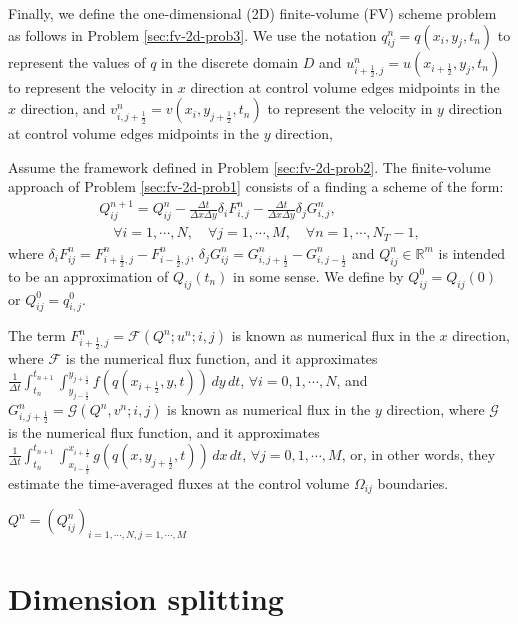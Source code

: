 Finally, we define the one-dimensional (2D) finite-volume (FV)
scheme problem as follows in Problem \ref{sec:fv-2d-prob3}.
We use the notation ${q}^n_{ij} = {q}(x_i, y_j, t_n)$
to represent the values of ${q}$ in the discrete domain $D$
and $u_{i+\frac{1}{2},j}^n = u(x_{i+\frac{1}{2}}, y_j, t_n)$
to represent the velocity in $x$ direction at control volume
edges midpoints in the $x$ direction, 
and $v_{i,j+\frac{1}{2}}^n = v(x_i,y_{j+\frac{1}{2}},t_n)$
to represent the velocity in $y$ direction at control volume
edges midpoints in the $y$ direction, 
\begin{prob}[2D-FV scheme]
	\label{sec:fv-2d-prob3}
	Assume the framework defined in Problem \ref{sec:fv-2d-prob2}.
	The finite-volume approach of Problem \ref{sec:fv-2d-prob1}
	consists of a finding a scheme of the form:
	\begin{align*}
		{Q}_{ij}^{n+1} =  {Q}_{ij}^{n} -
		\frac{\Delta t}{\Delta x \Delta y} 
        \delta_i {F}_{i,j}^{n} - 
		\frac{\Delta t}{\Delta x \Delta y}
        \delta_j {G}_{i,j}^{n},
		\\ \nonumber \quad \forall i = 1, \cdots, N, \quad \forall j = 1, \cdots, M,
		\quad \forall n = 1, \cdots, N_T-1,
	\end{align*}
	where $ \delta_i F_{ij}^n =
    {F}_{i+\frac{1}{2},j}^{n} 
    - {F}_{i-\frac{1}{2},j}^{n}$,
    $ \delta_j G_{ij}^n =
    {G}_{i,j+\frac{1}{2}}^{n} 
    - {G}_{i,j-\frac{1}{2}}^{n}$ 
    and ${Q}_{ij}^{n} \in \mathbb{R}^m$ is intended to be an approximation
	of ${Q}_{ij}(t_{n})$ in some sense. We define by ${Q}_{ij}^{0} = {Q}_{ij}(0)$ or
	${Q}_{ij}^{0} = {q}^0_{i,j}$.
    
    The term ${F}_{i+\frac{1}{2}, j}^{n} = {\mathcal{F}}
    (Q^n; u^n; i,j)
    $ is known as numerical flux in the 
    $x$ direction, where $\mathcal{F}$ is the numerical flux function, 
    and it approximates
	$\frac{1}{\Delta t}\int_{t_n}^{t_{n+1}} 
    \int_{y_{j-\frac{1}{2}}}^{y_{j+\frac{1}{2}}} 
    {f}({q}(x_{i+\frac{1}{2}}, y, t)) \,dy \,dt $,
    $\forall i = 0, 1, \cdots, N$,
    and 
	${G}_{i, j+\frac{1}{2}}^{n} = 
    {\mathcal{G}} (Q^n, v^n; i, j)$ 
    is known as numerical flux in the 
    $y$ direction, where $\mathcal{G}$ 
    is the numerical flux function, and it approximates
	$\frac{1}{\Delta t}\int_{t_n}^{t_{n+1}}  
    \int_{x_{i-\frac{1}{2}}}^{x_{i+\frac{1}{2}}}
    {g}({q}(x, y_{j+\frac{1}{2}}, t)) \,dx \,dt $,
    $\forall j = 0, 1, \cdots, M$,
	or, in other words, they estimate the time-averaged
    fluxes at the control volume $\Omega_{ij}$ boundaries.
\end{prob}
$Q^n = (Q_{ij}^n)_{i=1,\cdots, N, j = 1, \cdots, M}$

\section{Dimension splitting}
\label{sec-dimsplit}


\citep{lin:1997}
\citep{lin:2004}
\citep{putmanthesis:2007}
\citep{putman:2007}
